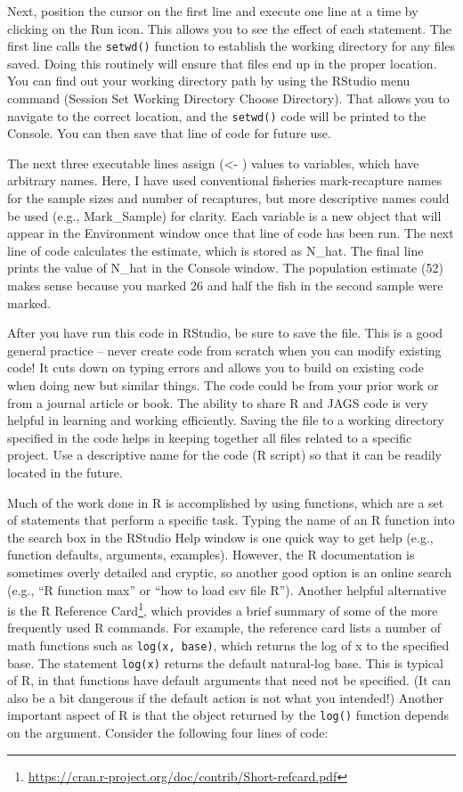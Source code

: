 \documentclass[
]{krantz}
\renewcommand{\href}[2]{#2\footnote{\url{#1}}}
\begin{document}
Next, position the cursor on the first line and execute one line at a time by clicking on the Run icon. This allows you to see the effect of each statement. The first line calls the \texttt{setwd()} function to establish the working directory for any files saved. Doing this routinely will ensure that files end up in the proper location. You can find out your working directory path by using the RStudio menu command (Session \textbar{} Set Working Directory \textbar{} Choose Directory). That allows you to navigate to the correct location, and the \texttt{setwd()} code will be printed to the Console. You can then save that line of code for future use.

The next three executable lines assign (\textless- ) values to variables, which have arbitrary names. Here, I have used conventional fisheries mark-recapture names for the sample sizes and number of recaptures, but more descriptive names could be used (e.g., Mark\_Sample) for clarity. Each variable is a new object that will appear in the Environment window once that line of code has been run. The next line of code calculates the estimate, which is stored as N\_hat. The final line prints the value of N\_hat in the Console window. The population estimate (52) makes sense because you marked 26 and half the fish in the second sample were marked.

After you have run this code in RStudio, be sure to save the file. This is a good general practice -- never create code from scratch when you can modify existing code! It cuts down on typing errors and allows you to build on existing code when doing new but similar things. The code could be from your prior work or from a journal article or book. The ability to share R and JAGS code is very helpful in learning and working efficiently. Saving the file to a working directory specified in the code helps in keeping together all files related to a specific project. Use a descriptive name for the code (R script) so that it can be readily located in the future.

Much of the work done in R is accomplished by using functions, which are a set of statements that perform a specific task. Typing the name of an R function into the search box in the RStudio Help window is one quick way to get help (e.g., function defaults, arguments, examples). However, the R documentation is sometimes overly detailed and cryptic, so another good option is an online search (e.g., ``R function max'' or ``how to load csv file R''). Another helpful alternative is the \href{https://cran.r-project.org/doc/contrib/Short-refcard.pdf}{R Reference Card}, which provides a brief summary of some of the more frequently used R commands. For example, the reference card lists a number of math functions such as \texttt{log(x,\ base)}, which returns the log of x to the specified base. The statement \texttt{log(x)} returns the default natural-log base. This is typical of R, in that functions have default arguments that need not be specified. (It can also be a bit dangerous if the default action is not what you intended!) Another important aspect of R is that the object returned by the \texttt{log()} function depends on the argument. Consider the following four lines of code:
\end{document}
